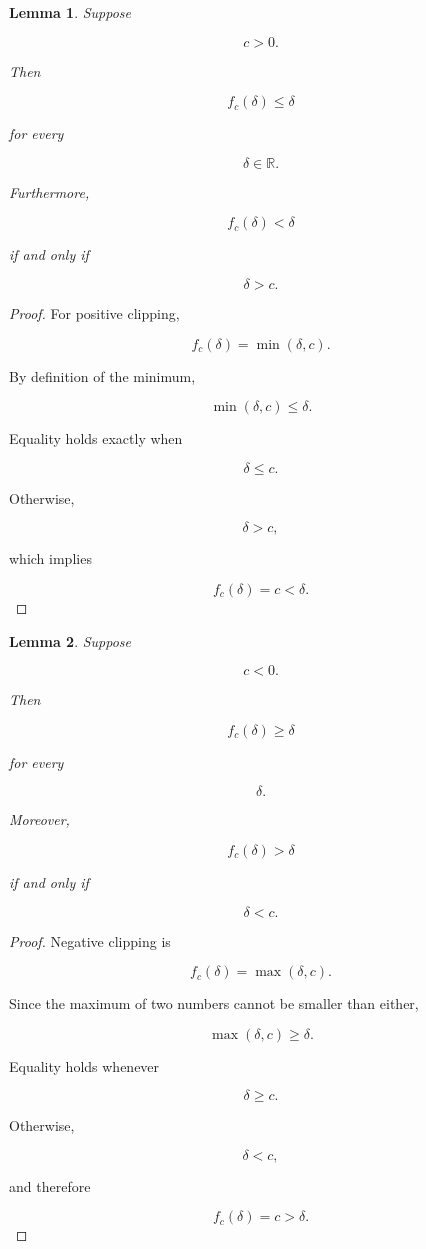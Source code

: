 \documentclass[11pt]{article}
\newtheorem{lemma}{Lemma}
\begin{document}
\begin{lemma}

Suppose

\[
c>0.
\]

Then

\[
f_c(\delta)
\le
\delta
\]

for every

\[
\delta\in\mathbb R.
\]

Furthermore,

\[
f_c(\delta)
<
\delta
\]

if and only if

\[
\delta>c.
\]

\end{lemma}

\begin{proof}

For positive clipping,

\[
f_c(\delta)
=
\min(\delta,c).
\]

By definition of the minimum,

\[
\min(\delta,c)
\le
\delta.
\]

Equality holds exactly when

\[
\delta
\le
c.
\]

Otherwise,

\[
\delta>c,
\]

which implies

\[
f_c(\delta)
=
c
<
\delta.
\]

\end{proof}


\begin{lemma}

Suppose

\[
c<0.
\]

Then

\[
f_c(\delta)
\ge
\delta
\]

for every

\[
\delta.
\]

Moreover,

\[
f_c(\delta)
>
\delta
\]

if and only if

\[
\delta<c.
\]

\end{lemma}

\begin{proof}

Negative clipping is

\[
f_c(\delta)
=
\max(\delta,c).
\]

Since the maximum of two numbers cannot be smaller than either,

\[
\max(\delta,c)
\ge
\delta.
\]

Equality holds whenever

\[
\delta
\ge
c.
\]

Otherwise,

\[
\delta<c,
\]

and therefore

\[
f_c(\delta)
=
c
>
\delta.
\]

\end{proof}
\end{document}
